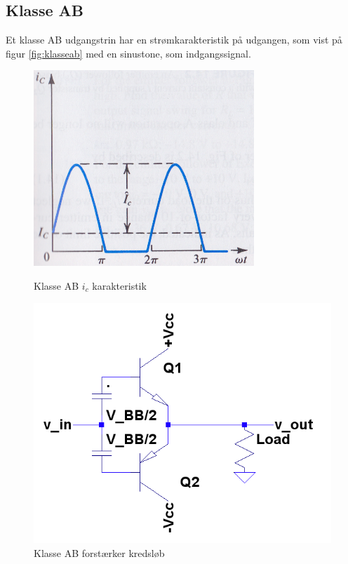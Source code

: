 \subsection{Klasse AB}
\label{klasse_ab}

Et klasse AB udgangstrin har en strømkarakteristik på udgangen, som vist på figur \ref{fig:klasseab} med en sinustone, som indgangssignal. 

\begin{figure}[ht]
\begin{minipage}[b]{0.5\linewidth}
\centering
\includegraphics[scale=.35]{valg_af_loesning/klasser/klasseab.png}
\caption{Klasse AB $i_c$ karakteristik\cite{sedra-smith}}
\label{fig:klasseab}
\end{minipage}
\hspace{0.5cm}
\begin{minipage}[b]{0.5\linewidth}
\centering
\includegraphics[scale=.35]{valg_af_loesning/klasser/classab.png}
\caption{Klasse AB forstærker kredsløb\cite{sedra-smith}}
\label{fig:classab}
\end{minipage}
\end{figure}


